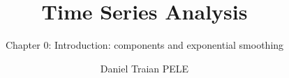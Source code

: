\title[Time Series Analysis]{Time Series Analysis}
\subtitle{Chapter 0: Introduction: components and exponential smoothing}
\author[D.T. Pele]{Daniel Traian PELE}
\date{}

\providecommand{\tsaapplink}[3]{\hypertarget{#2}{}\hyperlink{#1}{\beamergotobutton{#3}}}  %
\providecommand{\tsaappback}[2]{\begin{tikzpicture}[remember picture,overlay]\node[anchor=south east] at ([xshift=-3mm,yshift=7mm]current page.south east){\hyperlink{#1}{\beamerreturnbutton{#2}}};\end{tikzpicture}}  %
\providecommand{\tsachlink}[2]{\href{#1}{#2}}  %
\providecommand{\tsachlinkt}[2]{\href{#1}{\usebeamercolor[fg]{frametitle}#2}}  %


